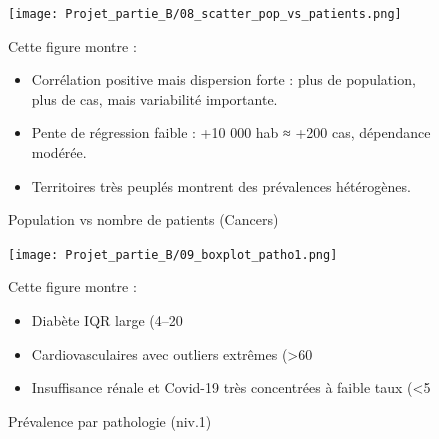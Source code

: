\documentclass[12pt,a4paper]{article}
\begin{document}
\begin{figure}[H]
  \centering
  \begin{minipage}[t]{0.48\textwidth}
    \centering
    \texttt{[image: Projet\_partie\_B/08\_scatter\_pop\_vs\_patients.png]}
    \caption{Population vs nombre de patients (Cancers)}
    \label{fig:scatter_pop_patients}
  \end{minipage}
  \hfill
  \begin{minipage}[t]{0.48\textwidth}
    \small
    Cette figure montre :
    \begin{itemize}
      \item Corrélation positive mais dispersion forte : plus de population, plus de cas, mais variabilité importante.  
      \item Pente de régression faible : +10 000 hab ≈ +200 cas, dépendance modérée.  
      \item Territoires très peuplés montrent des prévalences hétérogènes.  
    \end{itemize}
  \end{minipage}
\end{figure}

\begin{figure}[H]
  \centering
  \begin{minipage}[t]{0.48\textwidth}
    \centering
    \texttt{[image: Projet\_partie\_B/09\_boxplot\_patho1.png]}
    \caption{Prévalence par pathologie (niv.1)}
    \label{fig:boxplot_patho1}
  \end{minipage}
  \hfill
  \begin{minipage}[t]{0.48\textwidth}
    \small
    Cette figure montre :
    \begin{itemize}
      \item Diabète IQR large (4–20 %
      \item Cardiovasculaires avec outliers extrêmes (>60 %
      \item Insuffisance rénale et Covid-19 très concentrées à faible taux (<5 %
    \end{itemize}
  \end{minipage}
\end{figure}
\end{document}

